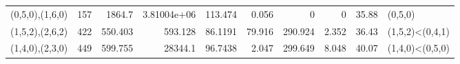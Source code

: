 \begin{tabular}{lrrrrrrrrl}
 (0,5,0),(1,6,0) &        157 &                          1864.7   &                     3.81004e+06 &                          113.474  &                           0.056 &                             0     &                           0     &      35.88 & (0,5,0)              \\
 (1,5,2),(2,6,2) &        422 &                           550.403 &                   593.128       &                           86.1191 &                          79.916 &                           290.924 &                           2.352 &      36.43 & (1,5,2)<(0,4,1)      \\
 (1,4,0),(2,3,0) &        449 &                           599.755 &                 28344.1         &                           96.7438 &                           2.047 &                           299.649 &                           8.048 &      40.07 & (1,4,0)<(0,5,0)      \\
\hline
\end{tabular}